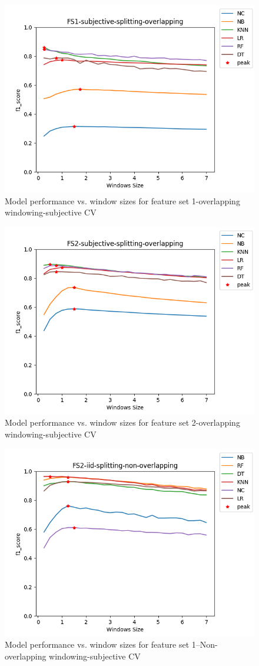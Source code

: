
\begin{figure}[h]
    \centering
    \includegraphics[width=.5\textwidth]{Figures/FS1-subjective-splitting-overlapping.png}
    \caption{Model performance vs. window sizes for feature set 1-overlapping windowing-subjective CV}
    \label{fig:sbj-over-fs1}
\end{figure}

\begin{figure}[h]
    \centering
    \includegraphics[width=.5\textwidth]{Figures/FS2-subjective-splitting-overlapping.png}
    \caption{Model performance vs. window sizes for feature set 2-overlapping windowing-subjective CV}
    \label{fig:sbj-nonover-fs2}
\end{figure}








\begin{figure}[h]
    \centering
    \includegraphics[width=.5\textwidth]{Figures/FS2-iid-splitting-non-overlapping.png}
    \caption{Model performance vs. window sizes for feature set 1--Non-overlapping windowing-subjective CV}
    \label{fig:sbj-nonover-fs1}
\end{figure}


